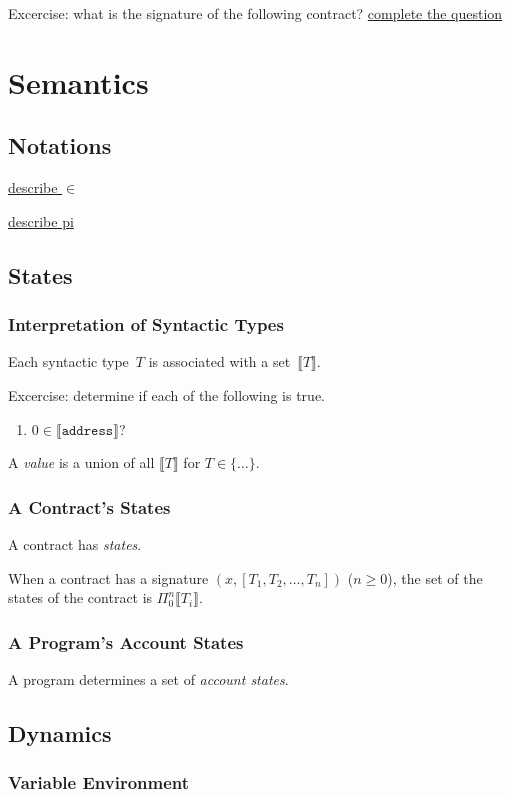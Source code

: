 \documentclass{book}
\newcommand{\todo}[1]{\underline{#1}}
\newcommand{\sem}[1]{\llbracket{#1}\rrbracket}
\begin{document}
Excercise: what is the signature of the following contract?
\todo{complete the question}

\chapter{Semantics}

\section{Notations}

\todo{describe $\in$}

\todo{describe pi}

\section{States}

\subsection{Interpretation of Syntactic Types}
Each syntactic type~$T$ is associated with a set~$\sem{T}$.

Excercise: determine if each of the following is true.
\begin{enumerate}
  \item $0 \in\sem{\mathtt{address}}$?
\end{enumerate}

A \textit{value} is a union of all $\sem{T}$ for $T \in \{\ldots\}$.

\subsection{A Contract's States}
A contract has \textit{states}.

When a contract has a signature $(x, [T_1, T_2, \ldots, T_n])$ ($n \ge 0$),
the set of the states of the contract is
$\Pi_0^{n} \sem{T_i}$.

\subsection{A Program's Account States}
A program determines a set of \textit{account states}.

\section{Dynamics}

\subsection{Variable Environment}
\end{document}
